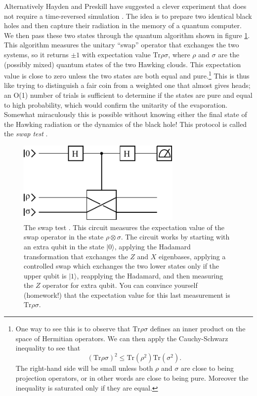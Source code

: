 \documentclass[12pt]{article}
\newcommand{\be}{\begin{equation}}
\newcommand{\ee}{\end{equation}}
\newcommand{\ran}{\rangle}
\begin{document}
Alternatively Hayden and Preskill have suggested a clever experiment that does not require a time-reversed simulation \cite{Hayden:2007cs}.  The idea is to prepare two identical black holes and then capture their radiation in the memory of a quantum computer.  We then pass these two states through the quantum algorithm shown in figure \ref{swap}.  This algorithm measures the unitary ``swap'' operator that exchanges the two systems, so it returns $\pm 1$ with expectation value $\mathrm{Tr} \rho \sigma$, where $\rho$ and $\sigma$ are the (possibly mixed) quantum states of the two Hawking clouds.  This expectation value is close to zero unless the two states are both equal and pure.\footnote{One way to see this is to observe that $\mathrm{Tr}\rho \sigma$ defines an inner product on the space of Hermitian operators.  We can then apply the Cauchy-Schwarz inequality to see that
\be
(\mathrm{Tr}\rho \sigma)^2\leq \mathrm{Tr} (\rho^2) \mathrm{Tr}(\sigma^2).
\ee
The right-hand side will be small unless both $\rho$ and $\sigma$ are close to being projection operators, or in other words are close to being pure.  Moreover the inequality is saturated only if they are equal.}  This is thus like trying to distinguish a fair coin from a weighted one that almost gives heads; an O(1) number of trials is sufficient to determine if the states are pure and equal to high probability, which would confirm the unitarity of the evaporation.  Somewhat miraculously this is possible without knowing either the final state of the Hawking radiation or the dynamics of the black hole!  This protocol is called the \textit{swap test} \cite{PhysRevLett.87.167902}.  
\begin{figure}
\begin{center}
\includegraphics[height=4cm]{swap.pdf}
\caption{The swap test \cite{PhysRevLett.87.167902}.  This circuit measures the expectation value of the swap operator in the state $\rho\otimes\sigma$.  The circuit works by starting with an extra qubit in the state $|0\ran$, applying the Hadamard transformation that exchanges the $Z$ and $X$ eigenbases, applying a controlled swap which exchanges the two lower states only if the upper qubit is $|1\ran$, reapplying the Hadamard, and then measuring the $Z$ operator for extra qubit.  You can convince yourself (homework!) that the expectation value for this last measurement is $\mathrm{Tr} \rho \sigma$.}\label{swap} 
\end{center}
\end{figure}
\end{document}

